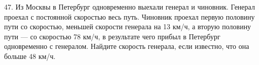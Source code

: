 47. Из Москвы в Петербург одновременно выехали генерал и чиновник. Генерал проехал с постоянной скоростью весь путь. Чиновник проехал первую половину пути со скоростью, меньшей скорости генерала на 13 км/ч, а вторую половину пути --- со скоростью 78 км/ч, в результате чего прибыл в Петербург одновременно с генералом. Найдите скорость генерала, если известно, что она больше 48 км/ч.\\

